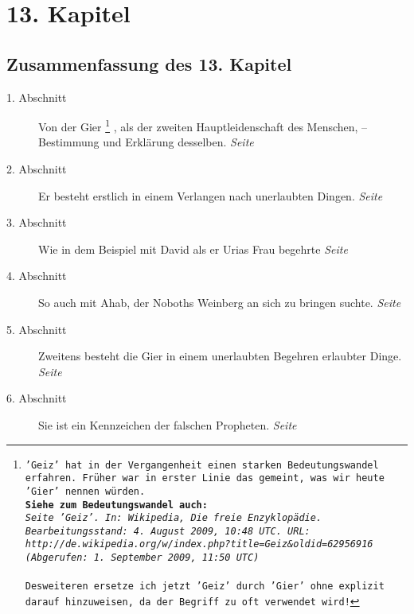 
\chapter{13. Kapitel} \label{kap13}

\section{Zusammenfassung des 13. Kapitel}

\begin{description}
\item[1. Abschnitt]  Von der Gier
\footnote{\texttt{'Geiz' hat in der Vergangenheit einen starken
Bedeutungswandel erfahren. Früher war in erster Linie das gemeint, was wir
heute 'Gier' nennen würden.
\\ \textbf{Siehe zum Bedeutungswandel auch:}
\\ \textit{Seite 'Geiz'. In: Wikipedia, Die freie Enzyklopädie.
Bearbeitungsstand: 4. August 2009, 10:48 UTC. URL:
\\ http://de.wikipedia.org/w/index.php?title=Geiz\&oldid=62956916
\\ (Abgerufen: 1. September 2009, 11:50 UTC) }
\\ \\ Desweiteren ersetze ich jetzt 'Geiz' durch 'Gier' ohne explizit darauf
hinzuweisen, da der Begriff zu oft verwendet wird!}}
, als der zweiten Hauptleidenschaft des Menschen,
-- Bestimmung und Erklärung desselben.
\dotfill \textit{Seite~\pageref{kap13_ab1}}\\
\item[2. Abschnitt] Er besteht erstlich in einem Verlangen nach unerlaubten
Dingen.
\dotfill \textit{Seite~\pageref{kap13_ab2}}\\
\item[3. Abschnitt] Wie in dem Beispiel mit David als er Urias Frau begehrte
\dotfill \textit{Seite~\pageref{kap13_ab3}}\\
\item[4. Abschnitt] So auch mit Ahab, der Noboths Weinberg an sich zu bringen
suchte.
\dotfill \textit{Seite~\pageref{kap13_ab4}}\\
\item[5. Abschnitt] Zweitens besteht die Gier in einem unerlaubten Begehren
erlaubter Dinge.
\dotfill \textit{Seite~\pageref{kap13_ab5}}\\
\item[6. Abschnitt] Sie ist ein Kennzeichen der falschen Propheten.
\dotfill \textit{Seite~\pageref{kap13_ab6}}\\

\end{description}

